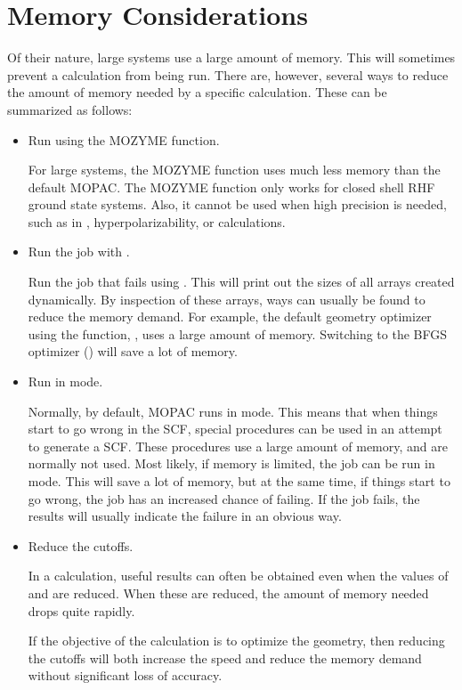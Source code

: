 \section{Memory Considerations}
Of their nature, large systems use a large amount of memory.  This will
sometimes prevent a calculation from being run.  There are, however, several
ways to reduce the amount of memory needed by a specific calculation.  These
can be summarized as follows:
\begin{itemize}
\item Run using the MOZYME function.

For large systems, the MOZYME function uses much less memory than 
the default MOPAC.  The MOZYME function only works for closed shell RHF 
ground state systems.  Also, it cannot be used when high precision is
needed, such as in , hyperpolarizability, or 
calculations.

\item Run the job with .

Run the job that fails using .  This will print out the sizes of
all arrays created dynamically.  By inspection of these arrays, ways can
usually be found to reduce the memory demand.  For example, the default 
geometry optimizer using the  function, , uses a large 
amount of memory.  Switching to the BFGS optimizer () will save a
lot of memory.

\item Run in  mode.  

Normally, by default, MOPAC runs in  mode.  This means that when
things start to go wrong in the SCF, special procedures can be used in an
attempt to generate a SCF.  These procedures use a large amount of memory, and
are normally not used.  Most likely, if memory is limited, the job can be run
in  mode.  This will save a lot of memory, but at the same time,
if things start to go wrong, the job has an increased chance of failing. If the
job fails, the results will usually indicate the failure in an obvious way.  

\item Reduce the cutoffs.

In a  calculation, useful results can often be obtained even when
the values of  and  are reduced. When these are
reduced, the amount of memory needed drops quite rapidly.

If the objective of the calculation is to optimize the geometry, then reducing
the cutoffs will both increase the speed and reduce the memory demand without
significant loss of accuracy.
\end{itemize}


